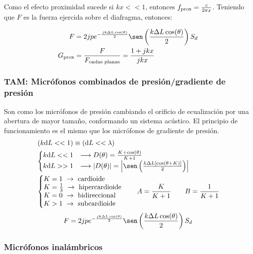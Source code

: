 \documentclass[a4paper, 8pt]{extarticle}
\renewcommand{\sin}{\sen}
\begin{document}
\begin{multicols}{3}
  Como el efecto proximidad sucede si $kx << 1$, entonces $f _{\textnormal{prox}} = \frac{c}{2 \pi x}$. Teniendo que $F$ es la fuerza ejercida sobre el diafragma, entonces:

  \begin{align*}
    F                      & = 2jp e^{- \frac{jk \Delta L \cos (\theta)}{2}} \sin \left( \frac{k \Delta L \cos (\theta)}{2} \right) S_d \\
    G _{\textnormal{prox}} & = \frac{F}{F _{\textnormal{ondas planas}}} = \frac{1 + jkx}{jkx}
  \end{align*}

  \subsubsection{TAM: Micrófonos combinados de presión/gradiente de presión}
  Son como los micrófonos de presión cambiando el orificio de ecualización por una abertura de mayor tamaño, conformando un sistema acústico. El principio de funcionamiento es el mismo que los micrófonos de gradiente de presión.
  \begin{align*}
     & \left( k \dd L << 1 \right) \equiv \left( \dd L << \lambda \right)                                                             \\
     & \left\lbrace
    \begin{matrix*}[l]
      k \dd L << 1 & \longrightarrow D (\theta ) = \frac{K + \cos (\theta)}{K + 1}                                                      \\
      k \dd L >> 1 & \longrightarrow \abs{D (\theta )} = \abs{\sin \left( \frac{k\Delta L \left[ \cos (\theta + K) \right]}{2} \right)}
    \end{matrix*} \right. \\
     & \left\lbrace
    \begin{matrix*}[l]
      K = 1 \ \rightarrow \text{ cardioide} \\
      K = \frac{1}{3} \ \rightarrow \text{ hipercardioide} \\
      K = 0 \ \rightarrow \text{ bidireccional} \\
      K > 1 \ \rightarrow \text{ subcardioide}
    \end{matrix*}
    \right.  \qquad  A = \frac{K}{K + 1} \qquad B = \frac{1}{K + 1}
  \end{align*}
  \[ F = 2jp e^{- \frac{jk \Delta L \cos (\theta)}{2}} \sin \left( \frac{k \Delta L \cos (\theta)}{2} \right) S_d \]

  \subsubsection{Micrófonos inalámbricos}


\end{multicols}
\end{document}
